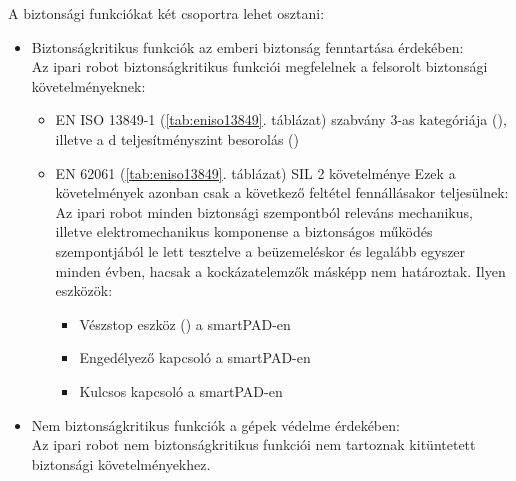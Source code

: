 \documentclass[../documentation.tex]{subfiles}
\begin{document}
A biztonsági funkciókat két csoportra lehet osztani:
\begin{itemize}
	\item Biztonságkritikus funkciók az emberi biztonság fenntartása érdekében:\\
	Az ipari robot biztonságkritikus funkciói megfelelnek a felsorolt biztonsági követelményeknek:
	\begin{itemize}
		\item EN ISO 13849-1 (\ref{tab:eniso13849}. táblázat) szabvány 3-as kategóriája (), illetve a d teljesítményszint besorolás ()
		\item EN 62061 (\ref{tab:eniso13849}. táblázat) SIL 2 követelménye
		Ezek a követelmények azonban csak a következő feltétel fennállásakor teljesülnek:\\
		Az ipari robot minden biztonsági szempontból releváns mechanikus, illetve elektromechanikus komponense a biztonságos működés szempontjából le lett tesztelve a beüzemeléskor és legalább egyszer minden évben, hacsak a kockázatelemzők másképp nem határoztak. Ilyen eszközök:
		\begin{itemize}
			\item Vészstop eszköz () a smartPAD-en
			\item Engedélyező kapcsoló a smartPAD-en
			\item Kulcsos kapcsoló a smartPAD-en
		\end{itemize}
	\end{itemize}
	\item Nem biztonságkritikus funkciók a gépek védelme érdekében:\\
	Az ipari robot nem biztonságkritikus funkciói nem tartoznak kitüntetett biztonsági követelményekhez.
\end{itemize}
\end{document}
